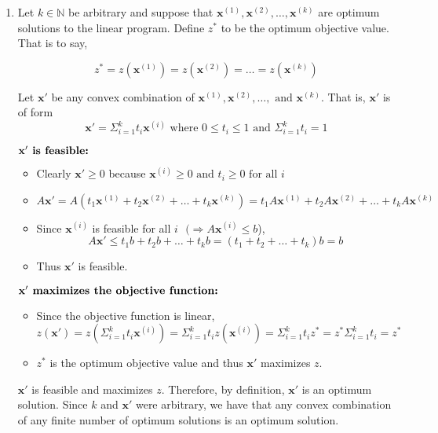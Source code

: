 \documentclass{article}[12pt,a4paper]
\begin{document}
  \begin{enumerate}
  \pagebreak
  	\item Let $k \in \mathbb{N}$ be arbitrary and suppose that $\mathbf{x}^{(1)} ,\mathbf{x}^{(2)} , \dots ,\mathbf{x}^{(k)}$
  	are optimum solutions to the linear program. Define $z^*$ to be the optimum objective value. That is to say,
  	
  	$$z^* = z(\mathbf{x}^{(1)}) =  z(\mathbf{x}^{(2)}) = \dots = z(\mathbf{x}^{(k)})$$
  	
  	Let $\mathbf x'$ be any convex combination of $\mathbf{x}^{(1)} ,\mathbf{x}^{(2)} , \dots , \mbox{ and } 
  	\mathbf{x}^{(k)}$.
  	That is, $\mathbf x'$ is of form
  	$$\mathbf x' = \Sigma_{i = 1}^{k}{t_i\mathbf{x}^{(i)}} \mbox{ where } 0 \le t_i \le 1 \mbox{ and }
  	 \Sigma_{i = 1}^{k}{t_i} = 1 $$
  
  	$\mathbf{x' \mbox{\textbf{ is feasible:}}}$
  	
  	\begin{itemize}
  	\item Clearly $\mathbf x' \ge 0$ because $\mathbf{x}^{(i)} \ge 0 \mbox{ and } t_i \ge 0 \mbox{ for all } i$
  	\item $A\mathbf x' = A(t_1\mathbf x^{(1)} + t_2\mathbf x^{(2)} + \dots + t_k\mathbf x^{(k)}) = 
  		t_1A\mathbf x^{(1)} + t_2A\mathbf x^{(2)} + \dots + t_kA\mathbf x^{(k)}$
  	\item Since $\mathbf x^{(i)}$ is feasible for all $i \mbox{ } (\Rightarrow A\mathbf x^{(i)} \le b$),  
		$$A\mathbf x' \le t_1b + t_2b + \dots + t_kb = (t_1 + t_2 + \dots + t_k)b = b$$
	\item Thus $\mathbf x'$ is feasible. \newline
  	\end{itemize}
  	
  	$\mathbf{x' \mbox{\textbf{ maximizes the objective function:}}}$
  	
  	\begin{itemize}
  	\item Since the objective function is linear,
  	$$z(\mathbf x') = z(\Sigma_{i = 1}^{k}{t_i\mathbf x^{(i)}}) = \Sigma_{i = 1}^{k}{t_iz(\mathbf x^{(i)})}
  		= \Sigma_{i = 1}^{k}{t_iz^*} = z^*\Sigma_{i = 1}^{k}{t_i} = z^*$$
	\item $z^*$ is the optimum objective value and thus $\mathbf x'$ maximizes $z$. \newline
  	\end{itemize}
  	
  	$\mathbf x'$ is feasible and maximizes $z$. Therefore, by definition, $\mathbf x'$ is an optimum solution.
  	Since $k$ and $\mathbf x'$ were arbitrary, we have that any convex combination of any finite number of
  	optimum solutions is an optimum solution.
  	\pagebreak
  	

\end{enumerate}
\end{document}
